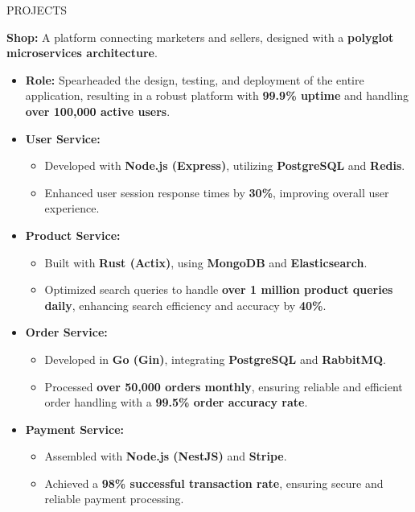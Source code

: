 \documentclass{resume} %
\begin{document}
\begin{rSection}{PROJECTS}

\item \textbf{Shop:} A platform connecting marketers and sellers, designed with a \textbf{polyglot microservices architecture}.

  \begin{itemize}
    \item \textbf{Role:} Spearheaded the design, testing, and deployment of the entire application, resulting in a robust platform with \textbf{99.9\% uptime} and handling \textbf{over 100,000 active users}.
    
    \item \textbf{User Service:}
      \begin{itemize}
        \item Developed with \textbf{Node.js (Express)}, utilizing \textbf{PostgreSQL} and \textbf{Redis}.
        \item Enhanced user session response times by \textbf{30\%}, improving overall user experience.
      \end{itemize}

    \item \textbf{Product Service:}
      \begin{itemize}
        \item Built with \textbf{Rust (Actix)}, using \textbf{MongoDB} and \textbf{Elasticsearch}.
        \item Optimized search queries to handle \textbf{over 1 million product queries daily}, enhancing search efficiency and accuracy by \textbf{40\%}.
      \end{itemize}

    \item \textbf{Order Service:}
      \begin{itemize}
        \item Developed in \textbf{Go (Gin)}, integrating \textbf{PostgreSQL} and \textbf{RabbitMQ}.
        \item Processed \textbf{over 50,000 orders monthly}, ensuring reliable and efficient order handling with a \textbf{99.5\% order accuracy rate}.
      \end{itemize}

    \item \textbf{Payment Service:}
      \begin{itemize}
        \item Assembled with \textbf{Node.js (NestJS)} and \textbf{Stripe}.
        \item Achieved a \textbf{98\% successful transaction rate}, ensuring secure and reliable payment processing.
      \end{itemize}


\end{itemize}
\end{rSection}
\end{document}
